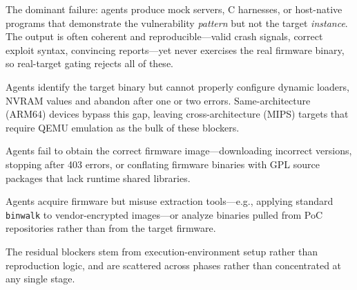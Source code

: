  The dominant failure: agents produce mock servers, C harnesses, or host-native programs that demonstrate the vulnerability \emph{pattern} but not the target \emph{instance}. The output is often coherent and reproducible---valid crash signals, correct exploit syntax, convincing reports---yet never exercises the real firmware binary, so real-target gating rejects all of these.

 Agents identify the target binary but cannot properly configure dynamic loaders, NVRAM values and abandon after one or two errors. Same-architecture (ARM64) devices bypass this gap, leaving cross-architecture (MIPS) targets that require QEMU emulation as the bulk of these blockers.

 Agents fail to obtain the correct firmware image---downloading incorrect versions, stopping after 403 errors, or conflating firmware binaries with GPL source packages that lack runtime shared libraries.

 Agents acquire firmware but misuse extraction tools---e.g., applying standard \texttt{binwalk} to vendor-encrypted images---or analyze binaries pulled from PoC repositories rather than from the target firmware.

 The residual blockers stem from execution-environment setup rather than reproduction logic, and are scattered across phases rather than concentrated at any single stage.
